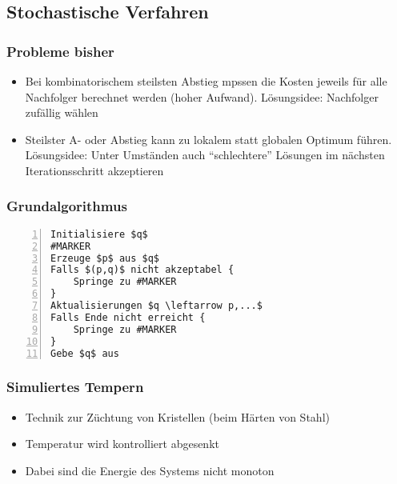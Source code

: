 \subsection{Stochastische Verfahren}

\subsubsection{Probleme bisher}
\begin{itemize}
	\item Bei kombinatorischem steilsten Abstieg mpssen die Kosten jeweils für alle Nachfolger berechnet werden (hoher Aufwand). Lösungsidee: Nachfolger zufällig wählen
	\item Steilster A- oder Abstieg kann zu lokalem statt globalen Optimum führen. Lösungsidee: Unter Umständen auch "`schlechtere"' Lösungen im nächsten Iterationsschritt akzeptieren
\end{itemize}

\subsubsection{Grundalgorithmus}
\begin{minipage}{\textwidth}
\begin{lstlisting}[frame=single,numbers=left,mathescape]
Initialisiere $q$
#MARKER
Erzeuge $p$ aus $q$
Falls $(p,q)$ nicht akzeptabel {
	Springe zu #MARKER
}
Aktualisierungen $q \leftarrow p,...$
Falls Ende nicht erreicht {
	Springe zu #MARKER
}
Gebe $q$ aus
\end{lstlisting}
\end{minipage}

\subsubsection{Simuliertes Tempern}
\begin{itemize}
	\item Technik zur Züchtung von Kristellen (beim Härten von Stahl)
	\item Temperatur wird kontrolliert abgesenkt
	\item Dabei sind die Energie des Systems nicht monoton
\end{itemize}

